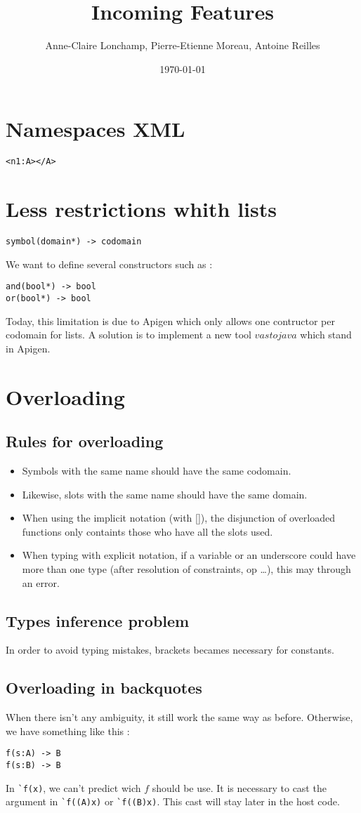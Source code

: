 \documentclass{article}
\title{Incoming Features}
\author{Anne-Claire Lonchamp, Pierre-Etienne Moreau, Antoine Reilles}
\date\today
\begin{document}
\maketitle

\section{Namespaces XML}
\verb$<n1:A></A>$

\section{Less restrictions whith lists}
\begin{verbatim}
symbol(domain*) -> codomain
\end{verbatim}
We want to define several constructors such as :
\begin{verbatim}
and(bool*) -> bool
or(bool*) -> bool
\end{verbatim}
Today, this limitation is due to Apigen which only allows one contructor per codomain for lists.
A solution is to implement a new tool $vastojava$ which stand in Apigen.

\section{Overloading}
\subsection{Rules for overloading}
\begin{itemize}
\item Symbols with the same name should have the same codomain.
\item Likewise, slots with the same name should have the same domain.
\item When using the implicit notation (with []), the disjunction of overloaded functions only containts those who have all the slots used.
\item When typing with explicit notation, if a variable or an underscore could have more than one type (after resolution of constraints, op \dots), this may through an error.
\end{itemize}
\subsection{Types inference problem}
In order to avoid typing mistakes, brackets becames necessary for constants.
\subsection{Overloading in backquotes}
When there isn't any ambiguity, it still work the same way as before.
Otherwise, we have something like this :
\begin{verbatim}
f(s:A) -> B
f(s:B) -> B
\end{verbatim}
In \verb$`f(x)$, we can't predict wich $f$ should be use. It is necessary to cast the argument in \verb$`f((A)x)$ or \verb$`f((B)x)$. This cast will stay later in the host code.
\end{document}
